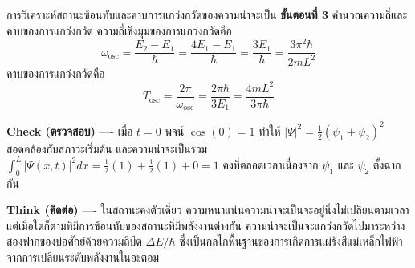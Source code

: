 \begin{psctbox}{การวิเคราะห์สถานะซ้อนทับและคาบการแกว่งกวัดของความน่าจะเป็น}
\textbf{ขั้นตอนที่ 3} คำนวณความถี่และคาบของการแกว่งกวัด
ความถี่เชิงมุมของการแกว่งกวัดคือ
\begin{equation*}
\omega_{\text{osc}} = \frac{E_2 - E_1}{\hbar} = \frac{4E_1 - E_1}{\hbar} = \frac{3E_1}{\hbar} = \frac{3\pi^2 \hbar}{2mL^2}
\end{equation*}
คาบของการแกว่งกวัดคือ
\begin{equation*}
T_{\text{osc}} = \frac{2\pi}{\omega_{\text{osc}}} = \frac{2\pi \hbar}{3E_1} = \frac{4mL^2}{3\pi \hbar}
\end{equation*}

\textbf{Check (ตรวจสอบ)} ---- เมื่อ $t = 0$ พจน์ $\cos(0) = 1$ ทำให้ $|\Psi|^2 = \frac{1}{2}(\psi_1 + \psi_2)^2$ สอดคล้องกับสภาวะเริ่มต้น และความน่าจะเป็นรวม $\int_0^L |\Psi(x, t)|^2 dx = \frac{1}{2}(1) + \frac{1}{2}(1) + 0 = 1$ คงที่ตลอดเวลาเนื่องจาก $\psi_1$ และ $\psi_2$ ตั้งฉากกัน

\textbf{Think (คิดต่อ)} ---- ในสถานะคงตัวเดี่ยว ความหนาแน่นความน่าจะเป็นจะอยู่นิ่งไม่เปลี่ยนตามเวลา แต่เมื่อใดก็ตามที่มีการซ้อนทับของสถานะที่มีพลังงานต่างกัน ความน่าจะเป็นจะแกว่งกวัดไปมาระหว่างสองฟากของบ่อศักย์ด้วยความถี่บีต $\Delta E/\hbar$ ซึ่งเป็นกลไกพื้นฐานของการเกิดการแผ่รังสีแม่เหล็กไฟฟ้าจากการเปลี่ยนระดับพลังงานในอะตอม
\end{psctbox}

